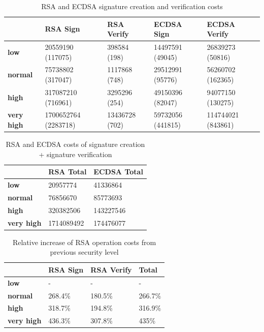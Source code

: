 \documentclass{llncs}
\begin{document}
\begin{table}[]
  \begin{tabular}{|l|l|l|l|l|}
  \hline
                    & \textbf{RSA Sign}    & \textbf{RSA Verify} & \textbf{ECDSA Sign} & \textbf{ECDSA Verify} \\ \hline
  \textbf{low}       & 20559190 (117075)    & 398584 (198)        & 14497591 (49045)    & 26839273 (50816)      \\ \hline
  \textbf{normal}    & 75738802 (317047)    & 1117868 (748)       & 29512991 (95776)    & 56260702 (162365)     \\ \hline
  \textbf{high}      & 317087210 (716961)   & 3295296 (254)       & 49150396 (82047)     & 94077150 (130275)     \\ \hline
  \textbf{very high} & 1700652764 (2283718) & 13436728 (702)      & 59732056 (441815)   & 114744021 (843861)    \\ \hline
  \end{tabular}
  \centering \caption{\label{table:rsa-costs-all-sls} RSA and ECDSA signature creation and verification costs} \end{table}

\begin{table}[]
  \begin{tabular}{|l|l|l|}
  \hline
                     & \textbf{RSA Total} & \textbf{ECDSA Total} \\ \hline
  \textbf{low}       & 20957774           & 41336864             \\ \hline
  \textbf{normal}    & 76856670           & 85773693             \\ \hline
  \textbf{high}      & 320382506          & 143227546            \\ \hline
  \textbf{very high} & 1714089492         & 174476077            \\ \hline
  \end{tabular}
  \centering \caption{\label{table:rsa-costs-all-sls-total} RSA and ECDSA costs of signature creation + signature verification}
\end{table}

\begin{table}[]
\begin{tabular}{|l|l|l|l|}
\hline
                   & \textbf{RSA Sign} & \textbf{RSA Verify} & \textbf{Total} \\ \hline
\textbf{low}       & -                 & -                   & -              \\ \hline
\textbf{normal}    & 268.4\%           & 180.5\%             & 266.7\%        \\ \hline
\textbf{high}      & 318.7\%           & 194.8\%             & 316.9\%        \\ \hline
\textbf{very high} & 436.3\%           & 307.8\%             & 435\%          \\ \hline
\end{tabular}
\centering \caption{\label{table:rsa-pub-priv-cost-increasee} Relative increase of RSA operation costs from previous security level}
\end{table}
\end{document}
